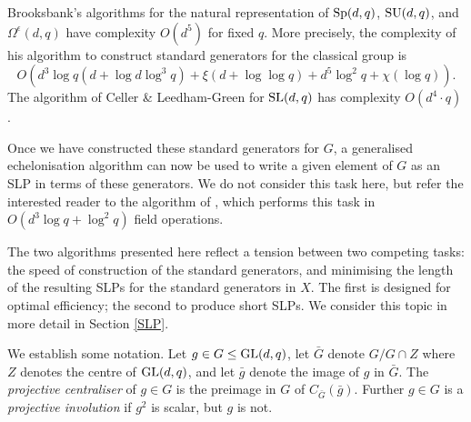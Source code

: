 \documentclass[12pt]{article}
\def\SL{{\rm SL}}
\def\GL{{\rm GL}}
\def\GF{{\rm GF}}
\def\Sp{{\rm Sp}}
\def\SU{{\rm SU}}
\begin{document}
Brooksbank's algorithms \cite{Brooksbank03} for the natural 
representation of $\Sp(d, q)$, $\SU(d, q)$, and $\Omega^\epsilon(d, q)$ 
have complexity $O(d^5)$ for fixed $q$. More precisely, 
the complexity of his algorithm to construct standard
generators for the classical group is 
$$O(d^3 \log q (d + \log d \log^3 q) + \xi(d + \log \log q) + d^5 \log^2 q
   + \chi(\log q)).$$
The algorithm of Celler \& Leedham-Green \cite{CellerLeedhamGreen98}
for $\SL(d, q)$ has complexity $O(d^4 \cdot q)$.

Once we have constructed these standard generators for $G$,
a generalised echelonisation algorithm can 
now be used to write a given element of $G$ 
as an SLP in terms of these generators.
We do not consider this task here, but refer 
the interested reader to the algorithm
of \cite[Section 5]{Brooksbank03},
which performs this task in $O(d^3\log q + \log^2 q)$ field operations. 

The two algorithms presented here reflect a tension 
between two competing tasks: the speed of construction
of the standard generators, and minimising the 
length of the resulting SLPs for the standard 
generators in $X$.
The first is designed for optimal efficiency; 
the second to produce short SLPs.
We consider this topic in more detail in Section \ref{SLP}.

We establish some notation. 
Let $g\in G \leq \GL(d, q)$, 
let $\bar{G}$ denote $G / G \cap Z$
where $Z$ denotes the centre of $\GL(d, q)$,
and let $\bar{g}$ denote the image of $g$ in $\bar{G}$.
The {\it projective centraliser} of $g \in G$
is the preimage in $G$ of $C_{\bar{G}} (\bar{g})$.
Further $g \in G$ is a {\it projective involution} 
if $g^2$ is scalar, but $g$ is not.
\end{document}
